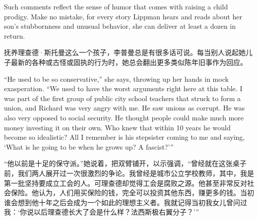 \ifdefined\eng
Such comments reflect the sense of humor that comes with raising a child prodigy. Make no mistake, for every story Lippman hears and reads about her son's stubbornness and unusual behavior, she can deliver at least a dozen in return.
\fi

\ifdefined\chs
抚养理查德·斯托曼这么一个孩子，李普曼总是有很多话可说。每当别人说起她儿子最新的各种或古怪或固执的行为时，她总会翻出更多类似陈年旧事作为回应。
\fi

\ifdefined\eng
``He used to be so conservative,'' she says, throwing up her hands in mock exasperation. ``We used to have the worst arguments right here at this table. I was part of the first group of public city school teachers that struck to form a union, and Richard was very angry with me. He saw unions as corrupt. He was also very opposed to social security. He thought people could make much more money investing it on their own. Who knew that within 10 years he would become so idealistic? All I remember is his stepsister coming to me and saying, `What is he going to be when he grows up? A fascist?'\hspace{0.01in}''\ifdefined\vtwo{}\fi
\fi

\ifdefined\chs
``他以前是十足的保守派。''她说着，把双臂铺开，以示强调，``曾经就在这张桌子前，我们两人展开过一次很激烈的争论。我曾经是城市公立学校教师，其中，我是第一批坚持要成立工会的人。可理查德却觉得工会是腐败之源。他甚至非常反对社会保险。他认为，人们用买保险的钱，完全可以投资其他东西，赚更多的钱。当初谁会想到他十年之后会成为一个如此的理想主义者。我就记得当初我女儿曾问过我：`你说以后理查德长大了会是什么样？法西斯极右翼分子？'\hspace{0.01in}''
\fi

